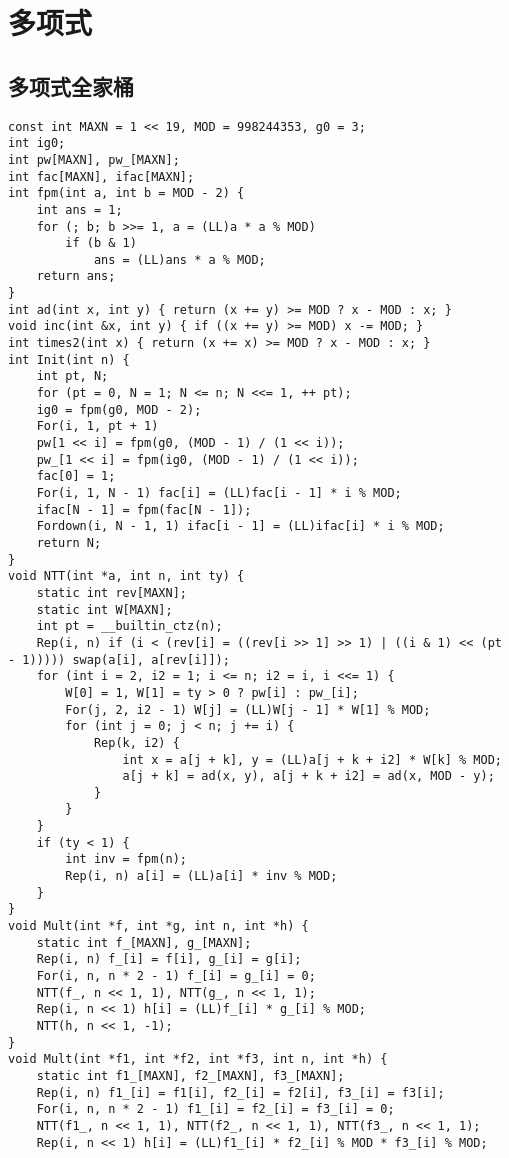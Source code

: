 \documentclass[twocolumn,a4]{article}
\begin{document}
\section{多项式}
\subsection{多项式全家桶}
\begin{lstlisting}
const int MAXN = 1 << 19, MOD = 998244353, g0 = 3;
int ig0;
int pw[MAXN], pw_[MAXN];
int fac[MAXN], ifac[MAXN];
int fpm(int a, int b = MOD - 2) {
    int ans = 1;
    for (; b; b >>= 1, a = (LL)a * a % MOD)
        if (b & 1)
            ans = (LL)ans * a % MOD;
    return ans;
}
int ad(int x, int y) { return (x += y) >= MOD ? x - MOD : x; }
void inc(int &x, int y) { if ((x += y) >= MOD) x -= MOD; }
int times2(int x) { return (x += x) >= MOD ? x - MOD : x; }
int Init(int n) {
    int pt, N;
    for (pt = 0, N = 1; N <= n; N <<= 1, ++ pt);
    ig0 = fpm(g0, MOD - 2);
    For(i, 1, pt + 1)
    pw[1 << i] = fpm(g0, (MOD - 1) / (1 << i));
	pw_[1 << i] = fpm(ig0, (MOD - 1) / (1 << i));
    fac[0] = 1;
    For(i, 1, N - 1) fac[i] = (LL)fac[i - 1] * i % MOD;
    ifac[N - 1] = fpm(fac[N - 1]);
    Fordown(i, N - 1, 1) ifac[i - 1] = (LL)ifac[i] * i % MOD;
    return N;
}
void NTT(int *a, int n, int ty) {
    static int rev[MAXN];
    static int W[MAXN];
    int pt = __builtin_ctz(n);
    Rep(i, n) if (i < (rev[i] = ((rev[i >> 1] >> 1) | ((i & 1) << (pt - 1))))) swap(a[i], a[rev[i]]);
    for (int i = 2, i2 = 1; i <= n; i2 = i, i <<= 1) {
        W[0] = 1, W[1] = ty > 0 ? pw[i] : pw_[i];
        For(j, 2, i2 - 1) W[j] = (LL)W[j - 1] * W[1] % MOD;
        for (int j = 0; j < n; j += i) {
            Rep(k, i2) {
                int x = a[j + k], y = (LL)a[j + k + i2] * W[k] % MOD;
                a[j + k] = ad(x, y), a[j + k + i2] = ad(x, MOD - y);
            }
        }
    }
    if (ty < 1) {
        int inv = fpm(n);
        Rep(i, n) a[i] = (LL)a[i] * inv % MOD;
    }
}
void Mult(int *f, int *g, int n, int *h) {
    static int f_[MAXN], g_[MAXN];
    Rep(i, n) f_[i] = f[i], g_[i] = g[i];
    For(i, n, n * 2 - 1) f_[i] = g_[i] = 0;
    NTT(f_, n << 1, 1), NTT(g_, n << 1, 1);
    Rep(i, n << 1) h[i] = (LL)f_[i] * g_[i] % MOD;
    NTT(h, n << 1, -1);
}
void Mult(int *f1, int *f2, int *f3, int n, int *h) {
    static int f1_[MAXN], f2_[MAXN], f3_[MAXN];
    Rep(i, n) f1_[i] = f1[i], f2_[i] = f2[i], f3_[i] = f3[i];
    For(i, n, n * 2 - 1) f1_[i] = f2_[i] = f3_[i] = 0;
    NTT(f1_, n << 1, 1), NTT(f2_, n << 1, 1), NTT(f3_, n << 1, 1);
    Rep(i, n << 1) h[i] = (LL)f1_[i] * f2_[i] % MOD * f3_[i] % MOD;

\end{lstlisting}
\end{document}

